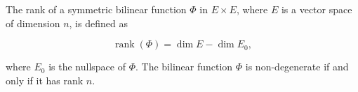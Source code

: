 The rank of a symmetric bilinear function $\Phi$ in $E \times E$, where $E$ is a vector space of dimension $n$, is defined as

$$\operatorname{rank}(\Phi) = \dim E - \dim E_0,$$

where $E_0$ is the nullspace of $\Phi$. The bilinear function $\Phi$ is non-degenerate if and only if it has rank $n$.
